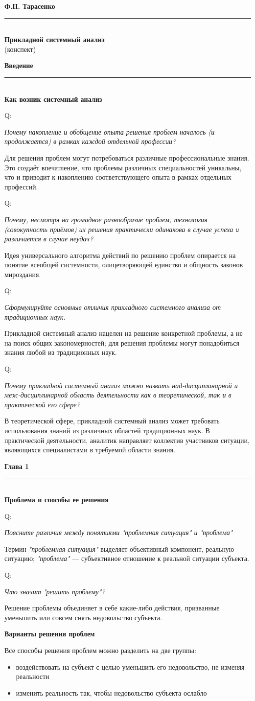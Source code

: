 \documentclass{article}
\newcommand{\note}[1]{\textit{#1}}
\renewcommand{\section}[2]{
	\vspace{5em}
	\begin{flushright}
	\Large
	\baselineskip=0.5\baselineskip
	\textbf{#1}
	\\
	\rule[0.5\baselineskip]{\textwidth}{0.15pt}
	\\
	\textbf{#2}
	\end{flushright}
	}
\renewcommand{\subsection}[1]{
	\vspace{2em}
	\begin{flushright}
		\large
		\textbf{#1}
	\end{flushright}
	}
\renewcommand{\title}[2]{
	\begin{center}
		\LARGE
		\baselineskip=0.5\baselineskip
		\textbf{#1}
		\\
		\rule[0.5\baselineskip]{0.7\textwidth}{0.15pt}
		\\
		\textbf{#2}
		\\\baselineskip=2\baselineskip(конспект)		
	\end{center}
	}
\newcommand{\question}[2]{
	\begin{flushright}
		Q:\hspace{2ex}\vline\hspace{2ex}
		\begin{minipage}{0.9\textwidth}
			\large
			\textit{#1}
		\end{minipage}
	\end{flushright}
	\begin{center}
		\begin{minipage}{0.95\textwidth}
			#2
		\end{minipage}
	\end{center}
	}
\begin{document}
\title{Ф.П. Тарасенко}{Прикладной системный анализ}
\section{Введение}{Как возник системный анализ}
\question{Почему накопление и обобщение опыта решения проблем началось (и продолжается) в рамках каждой отдельной профессии?}{Для решения проблем могут потребоваться различные профессиональные знания. Это создаёт впечатление, что проблемы различных специальностей уникальны, что и приводит к накоплению соответствующего опыта в рамках отдельных профессий.}
\question{Почему, несмотря на громадное разнообразие проблем, технология (совокупность приёмов) их решения практически одинакова в случае успеха и различается в случае неудач?}{Идея универсального алгоритма действий по решению проблем опирается на понятие всеобщей системности, олицетворяющей единство и общность законов мироздания.}
\question{Сформулируйте основные отличия прикладного системного анализа от традиционных наук.}{Прикладной системный анализ нацелен на решение конкретной проблемы, а не на поиск общих закономерностей; для решения проблемы могут понадобиться знания любой из традиционных наук.}
\question{Почему прикладной системный анализ можно назвать над-дисциплинарной и меж-дисциплинарной область деятельности как в теоретической, так и в практической его сфере?}{В теоретической сфере, прикладной системный анализ может требовать использования знаний из различных областей традиционных наук. В практической деятельности, аналитик направляет коллектив участников ситуации, являющихся специалистами в требуемой области знания.}
\section{Глава 1}{Проблема и способы ее решения}
\question{Поясните различия между понятиями "проблемная ситуация" и "проблема"}{
Термин \note{"проблемная ситуация"} выделяет объективный компонент, реальную ситуацию; \note{"проблема"} --- субъективное отношение к реальной ситуации субъекта.}
\question{Что значит "решить проблему"?}{Решение проблемы объединяет в себе какие-либо действия, призванные уменьшить или совсем снять недовольство субъекта.}
\subsection{Варианты решения проблем}
Все способы решения проблем можно разделить на две группы:
\begin{itemize}
	\item воздействовать на субъект с целью уменьшить его недовольство, не изменяя реальности
	\item изменить реальность так, чтобы недовольство субъекта ослабло
\end{itemize}
\end{document}
